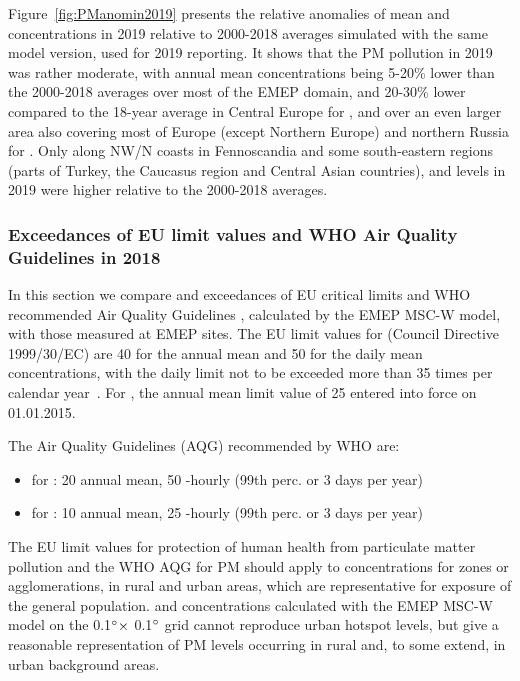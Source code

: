 Figure~\ref{fig:PManomin2019} presents the relative anomalies of mean \PM[10] and \PM[2.5] concentrations in 2019 relative to 2000-2018 averages simulated with the same model version, used for 2019 reporting. It shows that the PM pollution in 2019 was rather moderate, with annual mean concentrations being 5-20\% lower than the 2000-2018 averages over most of the EMEP domain, and 20-30\% lower compared to the 18-year average in Central Europe for \PM[10], and over an even larger area also covering most of Europe (except Northern Europe) and northern Russia for \PM[2.5]. Only along NW/N coasts in Fennoscandia and some south-eastern regions (parts of Turkey, the Caucasus region and Central Asian countries), \PM[10] and \PM[2.5] levels in 2019 were higher relative to the 2000-2018 averages. 


\subsubsection[PM exceedances]{Exceedances of EU limit values and WHO Air Quality Guidelines in 2018}
\label{subsec:PMexc}

In this section we compare \PM[10] and \PM[2.5] exceedances
of EU critical limits and WHO recommended Air Quality
Guidelines \citep{WHO:AQG}, calculated by the EMEP MSC-W model, with
those measured at EMEP sites. The EU limit values for \PM[10] (Council
Directive 1999/30/EC) are 40 \ug for the annual mean and 50 \ug for
the daily mean concentrations, with the daily limit not to be exceeded
more than 35 times per calendar year~\citep{EU2008}. For \PM[2.5], the
annual mean limit value of 25 \ug entered into force on 01.01.2015.

The Air Quality Guidelines (AQG) recommended by WHO \citep{WHO:AQG}
are:
\begin{itemize}
\item for \PM[10]: 20 \ug annual mean, 50 -hourly (99th perc. or 3 days per year)
\item for \PM[2.5]: 10 \ug annual mean, 25 -hourly (99th perc. or 3 days per year)
\end{itemize}


The EU limit values for protection of human health from particulate
matter pollution and the WHO AQG for PM should apply to concentrations
for zones or agglomerations, in rural and urban areas,
which are representative for exposure of the general
population. \PM[10] and \PM[2.5] concentrations calculated with the
EMEP MSC-W model on the 0.1$^\circ \times$ 0.1$^\circ$ grid cannot
reproduce urban hotspot levels, but give a reasonable representation
of PM levels occurring in rural and, to some extend, in urban background
areas.


